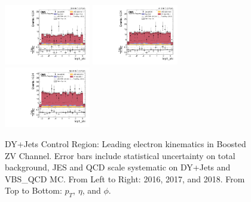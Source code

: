 \begin{figure}[!ht]
  \includegraphics[width=0.335\textwidth]{analysis_plots/2016_zv/cr_vjets_e/lep1_phi.pdf} \hspace{-10pt}
  \includegraphics[width=0.335\textwidth]{analysis_plots/2017_zv/cr_vjets_e/lep1_phi.pdf} \hspace{-10pt}
  \includegraphics[width=0.335\textwidth]{analysis_plots/2018_zv/cr_vjets_e/lep1_phi.pdf} \hspace{-10pt} \\
  \caption[DY+Jets Control Region: Leading electron kinematics in Boosted ZV Channel]%
  {DY+Jets Control Region: Leading electron kinematics in Boosted ZV Channel.
    Error bars include statistical uncertainty on total background,
    JES and QCD scale systematic on DY+Jets and VBS\_QCD MC\@.
    From Left to Right: 2016,
    2017, and 2018. From Top to Bottom: \( p_T \), \( \eta \), and \( \phi \).}%
  \label{fig:zv-cr-vjets-e-lep1-pt-eta-phi}
\end{figure}


